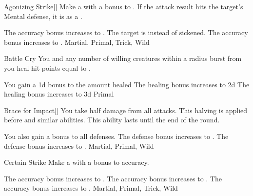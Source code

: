 
\lowercase{\hypertarget{maneuver:Agonizing Strike}{}}\label{maneuver:Agonizing Strike}
\begin{apability}{\hypertarget{maneuver:Agonizing Strike}{Agonizing Strike}}[]
Make a  with a  bonus to .
If the attack result hits the target's Mental defense,
it is  as a .

\rankline
{} The accuracy bonus increases to .
 The target is  instead of sickened.
 The accuracy bonus increases to .
 Martial, Primal, Trick, Wild
\end{apability}
\vspace{0.25em}



\lowercase{\hypertarget{maneuver:Battle Cry}{}}\label{maneuver:Battle Cry}
\begin{apability}{\hypertarget{maneuver:Battle Cry}{Battle Cry}}
You and any number of willing creatures within a \arealarge radius burst from you
heal hit points equal to .

\rankline
{} You gain a \plus1d bonus to the amount healed
 The healing bonus increases to \plus2d
 The healing bonus increases to \plus3d
 Primal
\end{apability}
\vspace{0.25em}



\lowercase{\hypertarget{maneuver:Brace for Impact}{}}\label{maneuver:Brace for Impact}
\begin{freeability}{\hypertarget{maneuver:Brace for Impact}{Brace for Impact}}[]
You take half damage from all attacks.
This halving is applied before  and similar abilities.
This ability lasts until the end of the round.

\rankline
{} You also gain a  bonus to all defenses.
 The defense bonus increases to .
 The defense bonus increases to .
 Martial, Primal, Wild
\end{freeability}
\vspace{0.25em}



\lowercase{\hypertarget{maneuver:Certain Strike}{}}\label{maneuver:Certain Strike}
\begin{apability}{\hypertarget{maneuver:Certain Strike}{Certain Strike}}
Make a  with a  bonus to accuracy.

\rankline
{} The accuracy bonus increases to .
 The accuracy bonus increases to .
 The accuracy bonus increases to .
 Martial, Primal, Trick, Wild
\end{apability}
\vspace{0.25em}



